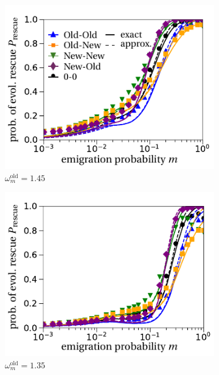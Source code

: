 \documentclass[11pt]{article}
\begin{document}
\begin{figure}[t!]
	\centering
	\begin{subfigure}{.5\textwidth}
  		\centering
  		\includegraphics[width=\linewidth]{fig5a.pdf}
  		\caption{$\omega^\text{old}_m=1.45$}
  		\label{fig:rescue_45}
	\end{subfigure}%
	\begin{subfigure}{.5\textwidth}
  		\centering
  		\includegraphics[width=\linewidth]{fig5b.pdf}
  		\caption{$\omega^\text{old}_m=1.35$}
  		\label{fig:rescue_35}
	\end{subfigure}
	\begin{subfigure}{.5\textwidth}

\end{subfigure}
\end{figure}
\end{document}
